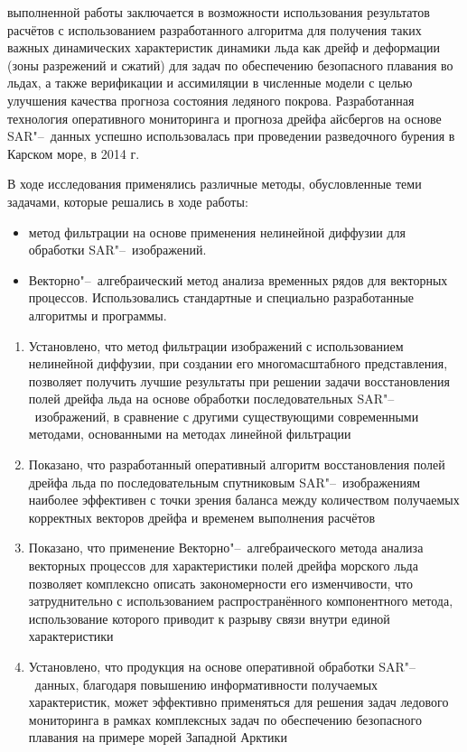 {\influence} выполненной работы заключается в возможности использования результатов расчётов с использованием разработанного алгоритма для получения таких важных динамических характеристик динамики льда как дрейф и деформации (зоны разрежений и сжатий) для задач по обеспечению безопасного плавания во льдах, а также верификации и ассимиляции в численные модели с целью улучшения качества прогноза состояния ледяного покрова. 
Разработанная технология оперативного мониторинга и прогноза дрейфа айсбергов на основе SAR"--~данных успешно использовалась при проведении разведочного бурения в Карском море, в 2014 г.

{\methods} В ходе исследования применялись различные методы, обусловленные теми задачами, которые решались в ходе работы:
\noindent
\begin{itemize}
	\item метод фильтрации на основе применения нелинейной диффузии для обработки SAR"--~изображений.
	\item Векторно"--~алгебраический метод анализа временных рядов для векторных процессов.
Использовались стандартные и специально разработанные алгоритмы и программы.
\end{itemize}


{}
\begin{enumerate}
  \item Установлено, что метод фильтрации изображений с использованием нелинейной диффузии, при создании его многомасштабного представления, позволяет получить лучшие результаты при решении задачи восстановления полей дрейфа льда на основе обработки последовательных SAR"--~изображений, в сравнение с другими существующими современными методами, основанными на методах линейной фильтрации
  \item Показано, что разработанный оперативный алгоритм восстановления полей дрейфа льда по последовательным спутниковым SAR"--~изображениям наиболее эффективен с точки зрения баланса между количеством получаемых корректных векторов дрейфа и временем выполнения расчётов
  \item Показано, что применение Векторно"--~алгебраического метода анализа векторных процессов для характеристики полей дрейфа морского льда позволяет комплексно описать закономерности его изменчивости, что затруднительно с использованием распространённого компонентного метода, использование которого приводит к разрыву связи внутри единой характеристики
  \item Установлено, что продукция на основе оперативной обработки SAR"--~данных, благодаря повышению информативности получаемых характеристик, может эффективно применяться для решения задач ледового мониторинга в рамках комплексных задач по обеспечению безопасного плавания на примере морей Западной Арктики
\end{enumerate}

